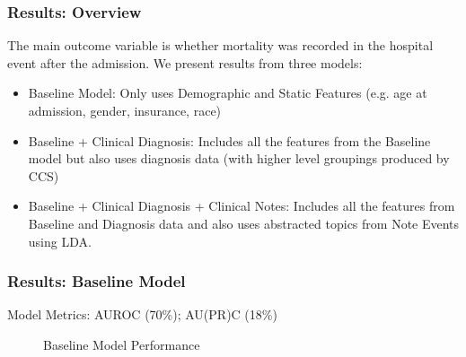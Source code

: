 \documentclass{beamer}
\begin{document}
\begin{frame}
\label{Results: Overview}
\frametitle{Results: Overview}
The main outcome variable is whether mortality was recorded in the hospital event after the admission. We present results from three models:

\begin{itemize}
\item Baseline Model: Only uses Demographic and Static Features (e.g. age at admission, gender, insurance, race)
\item Baseline + Clinical Diagnosis: Includes all the features from the Baseline model but also uses diagnosis data (with higher level groupings produced by CCS)
\item Baseline + Clinical Diagnosis + Clinical Notes: Includes all the features from Baseline and Diagnosis data and also uses abstracted topics from Note Events using LDA.
\end{itemize}
\end{frame}

\begin{frame}
\frametitle{Results: Baseline Model}

Model Metrics: AUROC (70\%); AU(PR)C (18\%)

\begin{figure}[H]
\centering     %
{}
\caption{Baseline Model Performance}
\label{BaselineModelPerformance}
\end{figure}
\end{frame}
\end{document}
